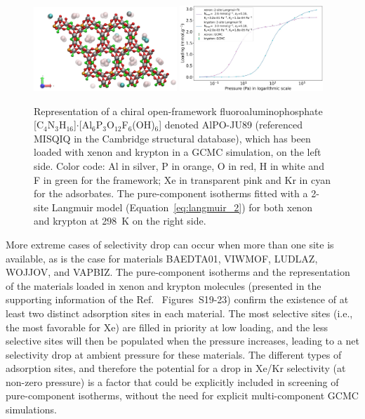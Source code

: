 \documentclass[main.tex]{subfiles}
\begin{document}
\begin{figure}[t]
  \centering
    \includegraphics[width=0.48\textwidth]{figures/2-thermo/MISQIQ_clean.jpg}\hfill
    \includegraphics[width=0.48\textwidth]{figures/2-thermo/MISQIQ_clean_isotherm_xenon_krypton_298K.jpg}
    \caption{Representation of a chiral open-framework fluoroaluminophosphate [C$_4$N$_3$H$_{16}$]$\cdot$[Al$_6$P$_3$O$_{12}$F$_6$(OH)$_6$] denoted AlPO-JU89 (referenced MISQIQ in the Cambridge structural database), which has been loaded with xenon and krypton in a GCMC simulation, on the left side.\autocite{MISQIQ} Color code: Al in silver, P in orange, O in red, H in white and F in green for the framework; Xe in transparent pink and Kr in cyan for the adsorbates. The pure-component isotherms fitted with a 2-site Langmuir model (Equation~\ref{eq:langmuir_2}) for both xenon and krypton at \SI{298}{\kelvin} on the right side.}\label{fgr:MISQIQ}
  \end{figure}

More extreme cases of selectivity drop can occur when more than one site is available, as is the case for materials BAEDTA01, VIWMOF, LUDLAZ, WOJJOV, and VAPBIZ. The pure-component isotherms and the representation of the materials loaded in xenon and krypton molecules (presented in the supporting information of the Ref.~\cite{Ren_2021} Figures~S19-23) confirm the existence of at least two distinct adsorption sites in each material. The most selective sites (i.e., the most favorable for Xe) are filled in priority at low loading, and the less selective sites will then be populated when the pressure increases, leading to a net selectivity drop at ambient pressure for these materials. The different types of adsorption sites, and therefore the potential for a drop in Xe/Kr selectivity (at non-zero pressure) is a factor that could be explicitly included in screening of pure-component isotherms, without the need for explicit multi-component GCMC simulations.
\end{document}
